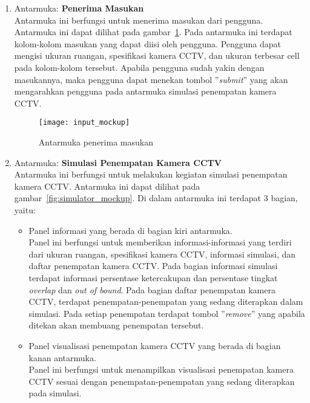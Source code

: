 \begin{enumerate}
	\item Antarmuka: \textbf{Penerima Masukan}\\
	Antarmuka ini berfungsi untuk menerima masukan dari pengguna. Antarmuka ini dapat dilihat pada gambar~\ref{fig:input_mockup}. Pada antarmuka ini terdapat kolom-kolom masukan yang dapat diisi oleh pengguna. Pengguna dapat mengisi ukuran ruangan, spesifikasi kamera CCTV, dan ukuran terbesar cell pada kolom-kolom tersebut. Apabila pengguna sudah yakin dengan masukannya, maka pengguna dapat menekan tombol ''\textit{submit}'' yang akan mengarahkan pengguna pada antarmuka simulasi penempatan kamera CCTV.
	\begin{figure}[h]
		\centering  
		\texttt{[image: input\_mockup]}
		\caption[Antarmuka penerima masukan]{Antarmuka penerima masukan}
		\label{fig:input_mockup}
	\end{figure}

	\item Antarmuka: \textbf{Simulasi Penempatan Kamera CCTV}\\
	Antarmuka ini berfungsi untuk melakukan kegiatan simulasi penempatan kamera CCTV. Antarmuka ini dapat dilihat pada gambar~\ref{fig:simulator_mockup}. Di dalam antarmuka ini terdapat 3 bagian, yaitu:
	\begin{itemize}
		\item Panel informasi yang berada di bagian kiri antarmuka.\\
		Panel ini berfungsi untuk memberikan informasi-informasi yang terdiri dari ukuran ruangan, spesifikasi kamera CCTV, informasi simulasi, dan daftar penempatan kamera CCTV. Pada bagian informasi simulasi terdapat informasi persentase ketercakupan dan persentase tingkat \textit{overlap} dan \textit{out of bound}. Pada bagian daftar penempatan kamera CCTV, terdapat penempatan-penempatan yang sedang diterapkan dalam simulasi. Pada setiap penempatan terdapat tombol ''\textit{remove}'' yang apabila ditekan akan membuang penempatan tersebut.
		
		\item Panel visualisasi penempatan kamera CCTV yang berada di bagian kanan antarmuka.\\
		Panel ini berfungsi untuk menampilkan visualisasi penempatan kamera CCTV sesuai dengan penempatan-penempatan yang sedang diterapkan pada simulasi.
		

\end{itemize}
\end{enumerate}
